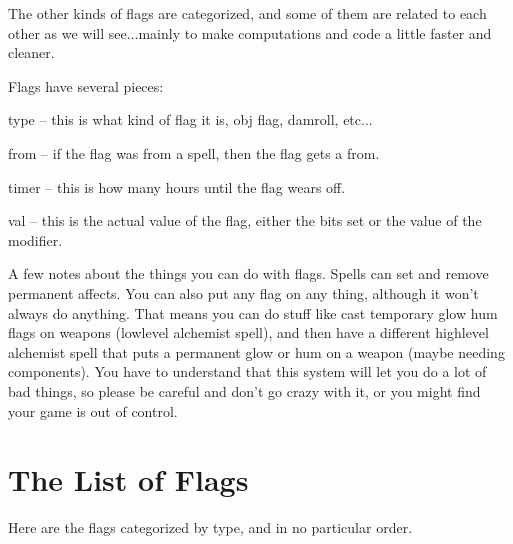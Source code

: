 The other kinds of flags are categorized, and some of them are
related to each other as we will see...mainly to make computations and
code a little faster and cleaner.

Flags have several pieces:

\bul type -- this is what kind of flag it is, obj flag, damroll, etc...

\bul from -- if the flag was from a spell, then the flag gets a from.

\bul timer -- this is how many hours until the flag wears off.

\bul val -- this is the actual value of the flag, either the bits set or the value of the modifier.

A few notes about the things you can do with flags. Spells can set and
remove permanent affects. You can also put any flag on any thing,
although it won't always do anything. That means you can do stuff like
cast temporary glow hum flags on weapons (lowlevel alchemist spell),
and then have a different highlevel alchemist spell that puts a permanent
glow or hum on a weapon (maybe needing components). You have to
understand that this system will let you do a lot of bad things, so
please be careful and don't go crazy with it, or you might find your
game is out of control.

\section{The List of Flags}
        
Here are the flags categorized by type, and in no particular order.


